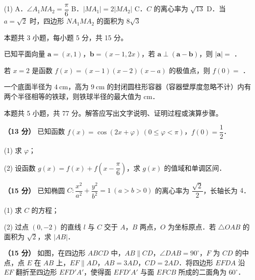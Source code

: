 \begin{gkopts}(1)
\task A．$\angle A_1MA_2=\dfrac{\pi}{6}$
\task B．$|MA_1|=2|MA_2|$
\task C．$C$ 的离心率为 $\sqrt{13}$
\task D．当 $a=\sqrt2$ 时，四边形 $NA_1MA_2$ 的面积为 $8\sqrt3$
\end{gkopts}

\par\medskip


\begin{gktip}
本题共 3 小题，每小题 5 分，共 15 分。
\end{gktip}

已知平面向量 $\boldsymbol{a}=(x,1)$，$\boldsymbol{b}=(x-1,2x)$，若 $\boldsymbol{a}\perp(\boldsymbol{a}-\boldsymbol{b})$，则 $|\boldsymbol{a}|=$ \gkblank{}．

若 $x=2$ 是函数 $f(x)=(x-1)(x-2)(x-a)$ 的极值点，则 $f(0)=$ \gkblank{}．

一个底面半径为 $4\ \mathrm{cm}$，高为 $9\ \mathrm{cm}$ 的封闭圆柱形容器（容器壁厚度忽略不计）内有两个半径相等的铁球，则铁球半径的最大值为 \gkblank{} $\mathrm{cm}$．

\par\medskip


\begin{gktip}
本题共 5 小题，共 77 分。解答应写出文字说明、证明过程或演算步骤。
\end{gktip}

\textbf{（13 分）} 已知函数 $f(x)=\cos(2x+\varphi)\ (0\le\varphi<\pi)$，$f(0)=\dfrac12$．

  (1) 求 $\varphi$；

  (2) 设函数 $g(x)=f(x)+f\left(x-\dfrac{\pi}{6}\right)$，求 $g(x)$ 的值域和单调区间．

\textbf{（15 分）} 已知椭圆 $C:\dfrac{x^2}{a^2}+\dfrac{y^2}{b^2}=1\ (a>b>0)$ 的离心率为 $\dfrac{\sqrt2}{2}$，长轴长为 $4$．

  (1) 求 $C$ 的方程；

  (2) 过点 $(0,-2)$ 的直线 $l$ 与 $C$ 交于 $A$，$B$ 两点，$O$ 为坐标原点．若 $\triangle OAB$ 的面积为 $\sqrt2$，求 $|AB|$．

\textbf{（15 分）} 如图，在四边形 $ABCD$ 中，$AB\parallel CD$，$\angle DAB=90^\circ$，$F$ 为 $CD$ 的中点，点 $E$ 在 $AB$ 上，$EF\parallel AD$，$AB=3AD$，$CD=2AD$．将四边形 $EFDA$ 沿 $EF$ 翻折至四边形 $EFD'A'$，使得面 $EFD'A'$ 与面 $EFCB$ 所成的二面角为 $60^\circ$．

